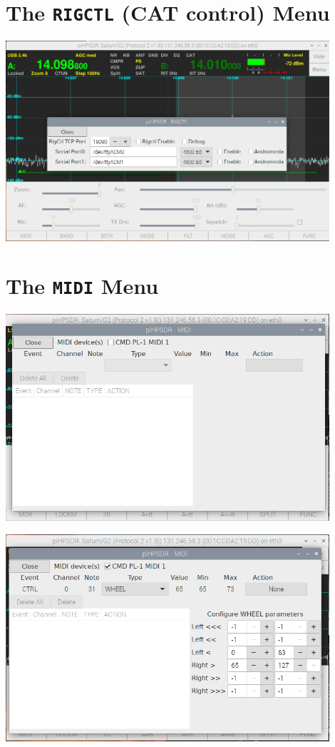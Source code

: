 \documentclass[12pt]{book}
\begin{document}
\section{The \texttt{RIGCTL} (CAT control) Menu}
\begin{center}
\includegraphics[width=12cm]{RigCtlMenu.png}
\end{center}

\section{The \texttt{MIDI} Menu}
\begin{center}
\includegraphics[width=12cm]{MIDImenu1.png}
\end{center}

\begin{center}
\includegraphics[width=12cm]{MIDImenu2.png}
\end{center}
\end{document}
